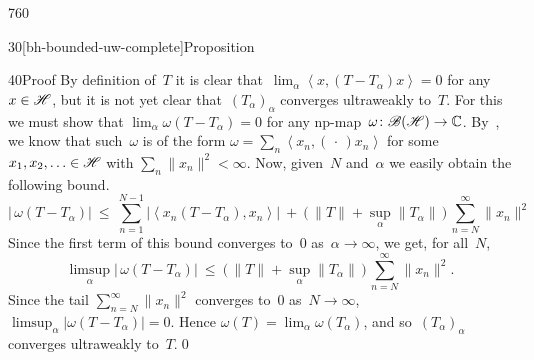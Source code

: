 \begin{parsec}{760}
\begin{point}{30}[bh-bounded-uw-complete]{Proposition}
\begin{point}{40}{Proof}
By definition of~$T$ it is clear 
that~$\lim_\alpha \left<x,(T-T_\alpha)x\right>=0$
for any~$x\in\mathscr{H}$,
but it is not yet clear that~$(T_\alpha)_\alpha$ converges ultraweakly to~$T$.
For this we must show that $\lim_\alpha \omega(T-T_\alpha)=0$
for any np-map~$\omega\colon \mathscr{B}(\mathscr{H})\to \mathbb{C}$.
By~,
we know that such~$\omega$ is of the form
$\omega=\sum_n \left<x_n,(\,\cdot\,)x_n\right>$
for some $x_1,x_2,\dotsc\in\mathscr{H}$ with $\sum_n\|x_n\|^2<\infty$.
Now, given~$N$ and~$\alpha$ we easily obtain the 
following bound.
\begin{equation*}
	|\,\omega(T-T_\alpha)| \ \leq\  
	\sum_{n=1}^{N-1} \left|\left<x_n(T-T_\alpha),x_n\right>\right|
\ +\ \bigl(\,\|T\|+\sup_\alpha\|T_\alpha\|\,\bigr)\,\sum_{n=N}^\infty \|x_n\|^2 
\end{equation*}
Since the first term of this bound converges to~$0$ as~$\alpha\to\infty$,
we get, for all~$N$,
\begin{equation*}
	\limsup_\alpha |\,\omega(T-T_\alpha)| \ \leq\ 
	\bigl(\,\|T\|+\sup_\alpha\|T_\alpha\|\,\bigr)\,\sum_{n=N}^\infty \|x_n\|^2.
\end{equation*}
Since the tail $\sum_{n=N}^\infty\|x_n\|^2$
converges to~$0$ as~$N\to \infty$,
$\limsup_\alpha \left|\omega(T-T_\alpha)\right|=0$.
Hence $\omega(T)=\lim_\alpha \omega(T_\alpha)$,
and so~$(T_\alpha)_\alpha$ converges ultraweakly to~$T$.\qed
\end{point}
\end{point}
\end{parsec}
